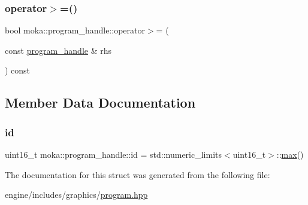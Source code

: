 \mbox{\label{structmoka_1_1program__handle_aad662908b45e21d277df7ce9b6851213}} 
\subsubsection{\texorpdfstring{operator$>$=()}{operator>=()}}
{\footnotesize\ttfamily bool moka\+::program\+\_\+handle\+::operator$>$= (\begin{DoxyParamCaption}\item[{const \mbox{\hyperlink{structmoka_1_1program__handle}{program\+\_\+handle}} \&}]{rhs }\end{DoxyParamCaption}) const\hspace{0.3cm}{\ttfamily [inline]}}



\subsection{Member Data Documentation}
\mbox{\label{structmoka_1_1program__handle_ab0a1eec073a076326b8a6f31848e9061}} 
\subsubsection{\texorpdfstring{id}{id}}
{\footnotesize\ttfamily uint16\+\_\+t moka\+::program\+\_\+handle\+::id = std\+::numeric\+\_\+limits$<$uint16\+\_\+t$>$\+::\mbox{\hyperlink{namespacemoka_acf03408f89c521244763fb5f8746ce16a2ffe4e77325d9a7152f7086ea7aa5114}{max}}()}



The documentation for this struct was generated from the following file\+:\begin{DoxyCompactItemize}
\item 
engine/includes/graphics/\mbox{\hyperlink{program_8hpp}{program.\+hpp}}\end{DoxyCompactItemize}
